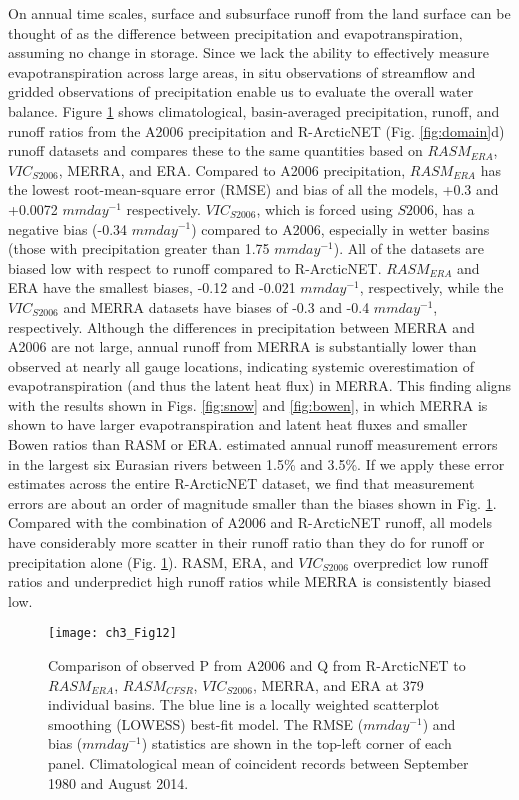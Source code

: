 On annual time scales, surface and subsurface runoff from the land surface can be thought of as the difference between precipitation and evapotranspiration, assuming no change in storage.
Since we lack the ability to effectively measure evapotranspiration across large areas, in situ observations of streamflow and gridded observations of precipitation enable us to evaluate the overall water balance.
Figure \ref{fig:streamflow_scatter} shows climatological, basin-averaged precipitation, runoff, and runoff ratios from the A2006 precipitation and R-ArcticNET (Fig. \ref{fig:domain}d) runoff datasets and compares these to the same quantities based on $RASM_{ERA}$, $VIC_{S2006}$, MERRA, and ERA.
Compared to A2006 precipitation, $RASM_{ERA}$ has the lowest root-mean-square error (RMSE) and bias of all the models, +0.3 and +0.0072 $mm day^{-1}$ respectively.
$VIC_{S2006}$, which is forced using $S2006$, has a negative bias (-0.34 $mm day^{-1}$) compared to A2006, especially in wetter basins (those with precipitation greater than 1.75 $mm day^{-1}$).
All of the datasets are biased low with respect to runoff compared to R-ArcticNET.
$RASM_{ERA}$ and ERA have the smallest biases, -0.12 and -0.021 $mm day^{-1}$, respectively, while the $VIC_{S2006}$ and MERRA datasets have biases of -0.3 and -0.4 $mm day^{-1}$, respectively.
Although the differences in precipitation between MERRA and A2006 are not large, annual runoff from MERRA is substantially lower than observed at nearly all gauge locations, indicating systemic overestimation of evapotranspiration (and thus the latent heat flux) in MERRA.
This finding aligns with the results shown in Figs. \ref{fig:snow} and \ref{fig:bowen}, in which MERRA is shown to have larger evapotranspiration and latent heat fluxes and smaller Bowen ratios than RASM or ERA.
\citet{Shiklomanov_2006} estimated annual runoff measurement errors in the largest six Eurasian rivers between 1.5\% and 3.5\%.
If we apply these error estimates across the entire R-ArcticNET dataset, we find that measurement errors are about an order of magnitude smaller than the biases shown in Fig. \ref{fig:streamflow_scatter}.
Compared with the combination of A2006 and R-ArcticNET runoff, all models have considerably more scatter in their runoff ratio than they do for runoff or precipitation alone (Fig. \ref{fig:streamflow_scatter}).
RASM, ERA, and $VIC_{S2006}$ overpredict low runoff ratios and underpredict high runoff ratios while MERRA is consistently biased low.


\begin{figure}
  \centering
  \texttt{[image: ch3\_Fig12]}
  \caption{Comparison of observed P from A2006 and Q from R-ArcticNET to $RASM_{ERA}$, $RASM_{CFSR}$, $VIC_{S2006}$, MERRA, and ERA at 379 individual basins.
  The blue line is a locally weighted scatterplot smoothing (LOWESS) best-fit model.
  The RMSE ($mm day^{-1}$) and bias ($mm day^{-1}$) statistics are shown in the top-left corner of each panel.
  Climatological mean of coincident records between September 1980 and August 2014.}
  \label{fig:streamflow_scatter}
\end{figure}

